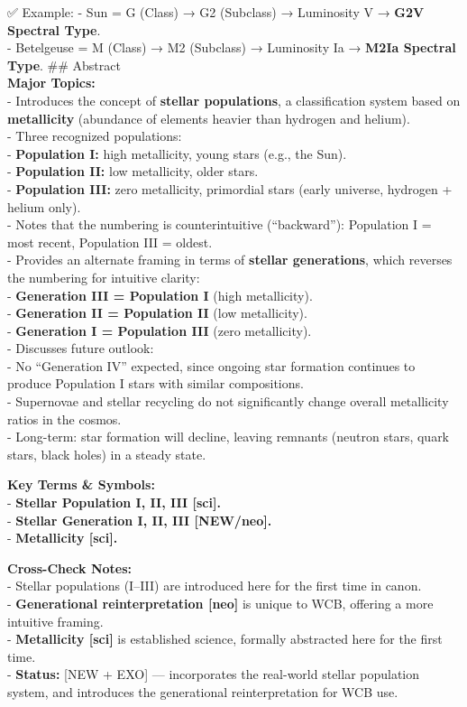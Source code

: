\documentclass[
  letterpaper,
]{book}
\begin{document}
✅ Example: - Sun = G (Class) → G2 (Subclass) → Luminosity V →
\textbf{G2V Spectral Type}.\\
- Betelgeuse = M (Class) → M2 (Subclass) → Luminosity Ia → \textbf{M2Ia
Spectral Type}. \#\# Abstract\\
\textbf{Major Topics:}\\
- Introduces the concept of \textbf{stellar populations}, a
classification system based on \textbf{metallicity} (abundance of
elements heavier than hydrogen and helium).\\
- Three recognized populations:\\
- \textbf{Population I:} high metallicity, young stars (e.g., the
Sun).\\
- \textbf{Population II:} low metallicity, older stars.\\
- \textbf{Population III:} zero metallicity, primordial stars (early
universe, hydrogen + helium only).\\
- Notes that the numbering is counterintuitive (``backward''):
Population I = most recent, Population III = oldest.\\
- Provides an alternate framing in terms of \textbf{stellar
generations}, which reverses the numbering for intuitive clarity:\\
- \textbf{Generation III = Population I} (high metallicity).\\
- \textbf{Generation II = Population II} (low metallicity).\\
- \textbf{Generation I = Population III} (zero metallicity).\\
- Discusses future outlook:\\
- No ``Generation IV'' expected, since ongoing star formation continues
to produce Population I stars with similar compositions.\\
- Supernovae and stellar recycling do not significantly change overall
metallicity ratios in the cosmos.\\
- Long-term: star formation will decline, leaving remnants (neutron
stars, quark stars, black holes) in a steady state.

\textbf{Key Terms \& Symbols:}\\
- \textbf{Stellar Population I, II, III {[}sci{]}.}\\
- \textbf{Stellar Generation I, II, III {[}NEW/neo{]}.}\\
- \textbf{Metallicity {[}sci{]}.}

\textbf{Cross-Check Notes:}\\
- Stellar populations (I--III) are introduced here for the first time in
canon.\\
- \textbf{Generational reinterpretation {[}neo{]}} is unique to WCB,
offering a more intuitive framing.\\
- \textbf{Metallicity {[}sci{]}} is established science, formally
abstracted here for the first time.\\
- \textbf{Status:} {[}NEW + EXO{]} --- incorporates the real-world
stellar population system, and introduces the generational
reinterpretation for WCB use.
\end{document}
